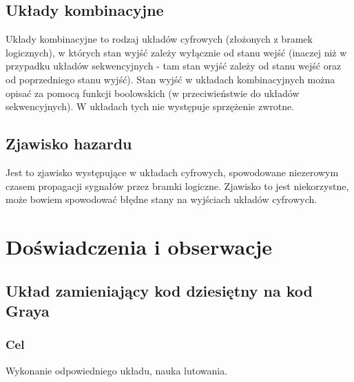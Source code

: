 \documentclass[12pt]{mwart}
\begin{document}
\subsection{Układy kombinacyjne}
Układy kombinacyjne to rodzaj układów cyfrowych (złożonych z bramek logicznych), w których stan wyjść zależy wyłącznie od stanu wejść (inaczej niż w przypadku układów sekwencyjnych - tam stan wyjść zależy od stanu wejść oraz od poprzedniego stanu wyjść). Stan wyjść w układach kombinacyjnych można opisać za pomocą funkcji boolowskich (w przeciwieństwie do układów sekwencyjnych). W układach tych nie występuje sprzężenie zwrotne.

\subsection{Zjawisko hazardu}
Jest to zjawisko występujące w układach cyfrowych, spowodowane niezerowym czasem propagacji sygnałów przez bramki logiczne. Zjawisko to jest niekorzystne, może bowiem spowodować błędne stany na wyjściach układów cyfrowych.

\section{Doświadczenia i obserwacje}
\subsection{Układ zamieniający kod dziesiętny na kod Graya}
\subsubsection{Cel}
Wykonanie odpowiedniego układu, nauka lutowania.
\end{document}
